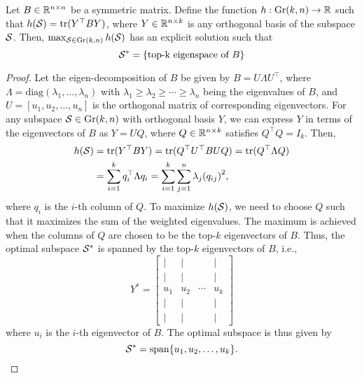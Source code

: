 \begin{lemma}\label{lem:top-k}
    Let $B \in \mathbb{R}^{n \times n}$ be a symmetric matrix. Define the function $h: \text{Gr}(k,n) \to \mathbb{R}$ such that $h(\mathcal{S}) = \mathrm{tr}(Y^\top B Y)$, where $Y \in \mathbb{R}^{n \times k}$ is any orthogonal basis of the subspace $\mathcal{S}$. Then, $\max_{\mathcal{S} \in \text{Gr}(k,n)} h(\mathcal{S})$ has an explicit solution such that 
    \[
        \mathcal{S}^* = \{\textrm{top-k eigenspace of } B\}
    \]
    \begin{proof}
        Let the eigen-decomposition of $B$ be given by $B = U \Lambda U^\top$, where $\Lambda = \mathrm{diag}(\lambda_1, \ldots, \lambda_n)$ with $\lambda_1 \geq \lambda_2 \geq \cdots \geq \lambda_n$ being the eigenvalues of $B$, and $U = [u_1, u_2, \ldots, u_n]$ is the orthogonal matrix of corresponding eigenvectors. For any subspace $\mathcal{S} \in \text{Gr}(k,n)$ with orthogonal basis $Y$, we can express $Y$ in terms of the eigenvectors of $B$ as $Y = U Q$, where $Q \in \mathbb{R}^{n \times k}$ satisfies $Q^\top Q = I_k$. Then,
        \begin{equation*}
        \begin{split}
            h(\mathcal{S}) &= \mathrm{tr}(Y^\top B Y) = \mathrm{tr}(Q^\top U^\top B U Q) = \mathrm{tr}(Q^\top \Lambda Q) \\
            &= \sum_{i=1}^{k} q_i^\top \Lambda q_i = \sum_{i=1}^{k} \sum_{j=1}^{n} \lambda_j {(q_{ij})}^2,
        \end{split}
        \end{equation*}
        where $q_i$ is the $i$-th column of $Q$. To maximize $h(\mathcal{S})$, we need to choose $Q$ such that it maximizes the sum of the weighted eigenvalues. The maximum is achieved when the columns of $Q$ are chosen to be the top-$k$ eigenvectors of $B$. Thus, the optimal subspace $\mathcal{S}^*$ is spanned by the top-$k$ eigenvectors of $B$, i.e., 
        \[
            Y^* = \begin{bmatrix}
            | & | & & | \\
            | & | & & | \\
            u_1 & u_2 & \cdots & u_k \\
            | & | & & | \\
            | & | & & |
            \end{bmatrix}
        \]
        where $u_i$ is the $i$-th eigenvector of $B$. The optimal subspace is thus given by 
        \[
            \mathcal{S}^* = \mathrm{span}\{u_1, u_2, \ldots, u_k\}.
        \]
    \end{proof}
\end{lemma}


